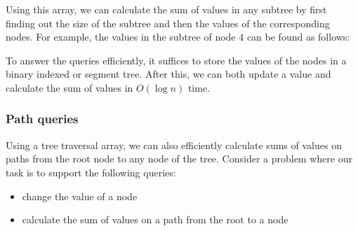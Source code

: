 Using this array, we can calculate the sum of values
in any subtree by first finding out the size of the subtree
and then the values of the corresponding nodes.
For example, the values in the subtree of node $4$
can be found as follows:

\begin{center}
\end{center}

To answer the queries efficiently,
it suffices to store the values of the
nodes in a binary indexed or segment tree.
After this, we can both update a value
and calculate the sum of values in $O(\log n)$ time.

\subsubsection{Path queries}

Using a tree traversal array, we can also efficiently
calculate sums of values on
paths from the root node to any
node of the tree.
Consider a problem where our task
is to support the following queries:
\begin{itemize}
\item change the value of a node
\item calculate the sum of values on a path from
the root to a node
\end{itemize}

